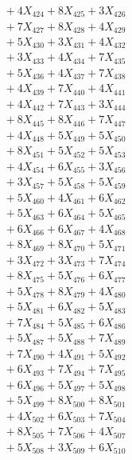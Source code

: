 \documentclass[a4paper,10pt]{article}
\begin{document}
{\begin{align}
&\;  + 4 X_{424} + 8 X_{425} + 3 X_{426} \\[0.3ex]
&\;  + 7 X_{427} + 8 X_{428} + 4 X_{429} \\[0.5ex]\allowbreak
&\;  + 5 X_{430} + 3 X_{431} + 4 X_{432} \\[0.3ex]
&\;  + 3 X_{433} + 4 X_{434} + 7 X_{435} \\[0.3ex]
&\;  + 5 X_{436} + 4 X_{437} + 7 X_{438} \\[0.3ex]
&\;  + 4 X_{439} + 7 X_{440} + 4 X_{441} \\[0.3ex]
&\;  + 4 X_{442} + 7 X_{443} + 3 X_{444} \\[0.3ex]
&\;  + 8 X_{445} + 8 X_{446} + 7 X_{447} \\[0.3ex]
&\;  + 4 X_{448} + 5 X_{449} + 5 X_{450} \\[0.3ex]
&\;  + 8 X_{451} + 5 X_{452} + 5 X_{453} \\[0.3ex]
&\;  + 4 X_{454} + 6 X_{455} + 3 X_{456} \\[0.3ex]
&\;  + 3 X_{457} + 5 X_{458} + 5 X_{459} \\[0.5ex]\allowbreak
&\;  + 5 X_{460} + 4 X_{461} + 6 X_{462} \\[0.3ex]
&\;  + 5 X_{463} + 6 X_{464} + 5 X_{465} \\[0.3ex]
&\;  + 6 X_{466} + 6 X_{467} + 4 X_{468} \\[0.3ex]
&\;  + 8 X_{469} + 8 X_{470} + 5 X_{471} \\[0.3ex]
&\;  + 3 X_{472} + 3 X_{473} + 7 X_{474} \\[0.3ex]
&\;  + 8 X_{475} + 5 X_{476} + 6 X_{477} \\[0.3ex]
&\;  + 5 X_{478} + 8 X_{479} + 4 X_{480} \\[0.3ex]
&\;  + 5 X_{481} + 6 X_{482} + 5 X_{483} \\[0.3ex]
&\;  + 7 X_{484} + 5 X_{485} + 6 X_{486} \\[0.3ex]
&\;  + 5 X_{487} + 5 X_{488} + 7 X_{489} \\[0.5ex]\allowbreak
&\;  + 7 X_{490} + 4 X_{491} + 5 X_{492} \\[0.3ex]
&\;  + 6 X_{493} + 7 X_{494} + 7 X_{495} \\[0.3ex]
&\;  + 6 X_{496} + 5 X_{497} + 5 X_{498} \\[0.3ex]
&\;  + 5 X_{499} + 8 X_{500} + 8 X_{501} \\[0.3ex]
&\;  + 4 X_{502} + 6 X_{503} + 7 X_{504} \\[0.3ex]
&\;  + 8 X_{505} + 7 X_{506} + 4 X_{507} \\[0.3ex]
&\;  + 5 X_{508} + 3 X_{509} + 6 X_{510} \\[0.3ex]

\end{align}}
\end{document}
